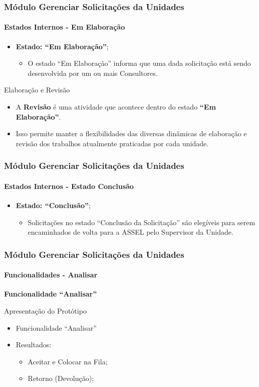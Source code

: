 \begin{frame}
	\frametitle{Módulo Gerenciar Solicitações da Unidades}
	\framesubtitle{Estados Internos - Em Elaboração}
	\begin{itemize}
		\item \textbf{Estado: ``Em Elaboração''};
		\begin{itemize}
			\item O estado ``Em Elaboração'' informa que uma dada solicitação está sendo desenvolvida por um ou mais Consultores. 
		\end{itemize}
	\end{itemize}

	\begin{block}{Elaboração e Revisão}
		\begin{itemize}
			\item A \textbf{Revisão} é uma atividade que acontece dentro do estado \textbf{``Em Elaboração''}.
			\item Isso permite manter a flexibilidades das diversas dinâmicas de elaboração e revisão dos trabalhos atualmente praticadas por cada unidade.
		\end{itemize}
	\end{block}
\end{frame}

\begin{frame}
	\frametitle{Módulo Gerenciar Solicitações da Unidades}
	\framesubtitle{Estados Internos - Estado Conclusão}
	\begin{itemize}
		\item \textbf{Estado: ``Conclusão''};
		\begin{itemize}
			\item Solicitações no estado ``Conclusão da Solicitação'' são elegíveis para serem encaminhados de volta para a ASSEL pelo Supervisor da Unidade. 
		\end{itemize}
	\end{itemize}
\end{frame}

\begin{frame}
	\frametitle{Módulo Gerenciar Solicitações da Unidades}
	\framesubtitle{Funcionalidades - Analisar}

	\textbf{Funcionalidade ``Analisar''}

	\begin{block}{Apresentação do Protótipo}
		\begin{itemize}
			\item Funcionalidade ``Analisar''
			\item Resultados:
			\begin{itemize}
				\item Aceitar e Colocar na Fila;
				\item Retorno (Devolução);
			\end{itemize}
		\end{itemize}
	\end{block}	
\end{frame}

